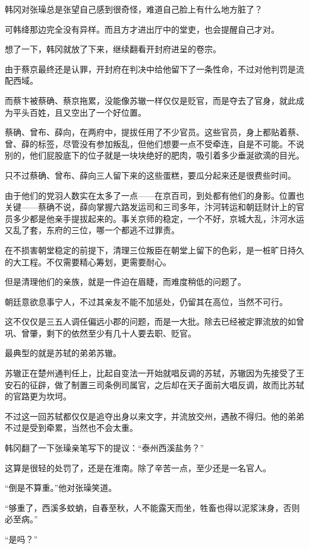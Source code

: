 韩冈对张璪总是张望自己感到很奇怪，难道自己脸上有什么地方脏了？

可韩绛那边完全没有异样。而且方才进出厅中的堂吏，也会提醒自己才对。

想了一下，韩冈就放了下来，继续翻看开封府进呈的卷宗。

由于蔡京最终还是认罪，开封府在判决中给他留下了一条性命，不过对他判罚是流配西域。

而蔡卞被蔡确、蔡京拖累，没能像苏辙一样仅仅是贬官，而是夺去了官身，就此成为平头百姓，且又空出了一个好位置。

蔡确、曾布、薛向，在两府中，提拔任用了不少官员。这些官员，身上都贴着蔡、曾、薛的标签，尽管没有参加叛乱，但他们想要一点不受牵连，自是不可能。不说别的，他们屁股底下的位子就是一块块绝好的肥肉，吸引着多少垂涎欲滴的目光。

只不过蔡确、曾布、薛向三人留下来的这些蛋糕，要瓜分起来还是很费些时间。

由于他们的党羽人数实在太多了一点——在京百司，到处都有他们的身影。位置也关键——蔡确不说，薛向掌握六路发运司和三司多年，汴河转运和朝廷财计上的官员多少都是他亲手提拔起来的。事关京师的稳定，一个不好，京城大乱，汴河水运又乱了套，东府的三位，哪一个都逃不过罪责。

在不损害朝堂稳定的前提下，清理三位叛臣在朝堂上留下的色彩，是一桩旷日持久的大工程。不仅需要精心筹划，更需要耐心。

但是清理他们的亲族，就是一件迫在眉睫，而难度稍低的问题了。

朝廷意欲息事宁人，不过其亲友不能不加惩处，仍留其在高位，当然不可行。

这不仅仅是三五人调任偏远小郡的问题，而是一大批。除去已经被定罪流放的如曾巩、曾肇，剩下的依然至少有几十人要去职、贬官。

最典型的就是苏轼的弟弟苏辙。

苏辙正在楚州通判任上，比起自变法一开始就唱反调的苏轼，苏辙因为先接受了王安石的征辟，做了制置三司条例司属官，之后却在天子面前大唱反调，故而比苏轼的官路更为坎坷。

不过这一回苏轼都仅仅是追夺出身以来文字，并流放交州，遇赦不得归。他的弟弟不过是受到牵累，当然也不会太重。

韩冈翻了一下张璪亲笔写下的提议：“泰州西溪盐务？”

这算是很轻的处罚了，还是在淮南。除了辛苦一点，至少还是一名官人。

“倒是不算重。”他对张璪笑道。

“够重了，西溪多蚊蚋，自春至秋，人不能露天而坐，牲畜也得以泥浆沫身，否则必至病。”

“是吗？”

